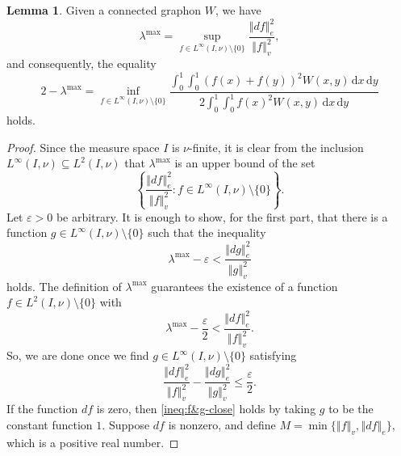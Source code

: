 \documentclass[12pt,a4paper,bold]{thesis}
\theoremstyle{definition}
\newtheorem{lemma}[thm]{Lemma}
\newcommand*{\norm}[2][]{\left\Vert #2 \right\Vert_{#1}}
\begin{document}
\begin{lemma} \label{lemma:lambda-max-Linfty}
    Given a connected graphon $W$, we have
    \begin{equation*}
        \lambda^{\max} = \sup_{f \in L^{\infty}(I, \nu) \setminus \{0\}}
        \frac{\norm[e]{df}^2}{\norm[v]{f}^2},
    \end{equation*}
    and consequently, the equality 
    \begin{equation*}
        2 - \lambda^{\max} = \inf_{f \in L^{\infty}(I, \nu) \setminus \{0\}}
        \frac{\int_0^1 \int_0^1 (f(x) + f(y))^2 W(x,y)\, \mathrm{d}x\, \mathrm{d}y}
        {2 \int_0^1 \int_0^1 f(x)^2 W(x,y)\, \mathrm{d}x\, \mathrm{d}y}
    \end{equation*}
    holds.
\end{lemma}

\begin{proof}
    Since the measure space $I$ is $\nu$-finite, it is clear from the inclusion
    $L^{\infty}(I, \nu) \subseteq L^2(I, \nu)$ that $\lambda^{\max}$ is an upper 
    bound of the set 
    \begin{equation*}
        \left\{\frac{\norm[e]{df}^2}{\norm[v]{f}^2} : 
        f \in L^{\infty}(I, \nu) \setminus \{0\}\right\}.
    \end{equation*}
    Let $\varepsilon > 0$ be arbitrary. It is enough to show, for the first part,
    that there is a function $g \in L^{\infty}(I, \nu) \setminus \{0\}$ such that 
    the inequality
    \begin{equation*}
        \lambda^{\max} - \varepsilon < \frac{\norm[e]{dg}^2}{\norm[v]{g}^2}
    \end{equation*} 
    holds. The definition of $\lambda^{\max}$ guarantees the existence of a function
    $f \in L^2(I, \nu) \setminus \{0\}$ with 
    \begin{equation*}
        \lambda^{\max} - \frac{\varepsilon}{2} < \frac{\norm[e]{df}^2}{\norm[v]{f}^2}.
    \end{equation*} 
    So, we are done once we find $g \in L^{\infty}(I, \nu) \setminus \{0\}$ satisfying
    \begin{equation} \label{ineq:f&g-close}
        \frac{\norm[e]{df}^2}{\norm[v]{f}^2} - \frac{\norm[e]{dg}^2}{\norm[v]{g}^2}
        \leq \frac{\varepsilon}{2}.
    \end{equation}
    If the function $df$ is zero, then \eqref{ineq:f&g-close} holds by taking $g$ 
    to be the constant function $1$. Suppose $df$ is nonzero, and define 
    $M = \min\{\norm[v]{f}, \norm[e]{df}\}$, which is a positive real number. 

\end{proof}
\end{document}

